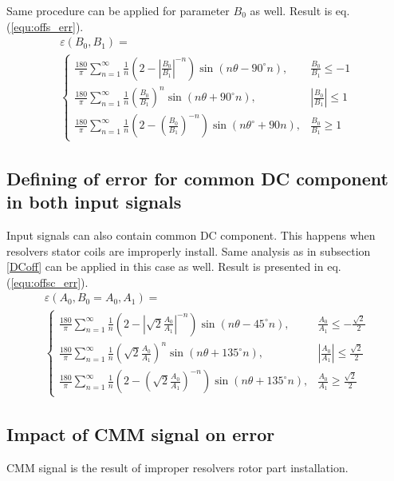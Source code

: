 \documentclass[a4paper]{article}
\begin{document}
Same procedure can be applied for parameter $B_0$ as well. Result is eq. (\ref{equ:offs_err}).
\begin{multline}
\label{equ:offs_err}
\varepsilon(B_0, B_1)=\\
\begin{cases}
\frac{180}{\pi}\sum_{n=1}^{\infty}\frac{1}{n}(2-|\frac{B_0}{B_1}|^{-n}) \sin (n \theta -  90^\circ n), & \frac{B_0}{B_1}\leq -1 \\
\frac{180}{\pi}\sum_{n=1}^{\infty}\frac{1}{n}(\frac{B_0}{B_1})^n \sin (n \theta + 90^\circ n), & |\frac{B_0}{B_1}|\leq 1 \\
\frac{180}{\pi}\sum_{n=1}^{\infty}\frac{1}{n}(2-(\frac{B_0}{B_1})^{-n}) \sin (n \theta^\circ + 90 n), & \frac{B_0}{B_1}\geq 1
\end{cases}
\end{multline}

\subsection{Defining of error for common DC component in both input signals}
Input signals can also contain common DC component. 
This happens when resolvers stator coils are improperly install. Same analysis as in subsection \ref{DCoff} can be applied in this case as well. Result is presented in eq. (\ref{equ:offsc_err}).
\begin{multline}
\label{equ:offsc_err}
\varepsilon(A_0,B_0=A_0, A_1)=\\
\begin{cases}
\frac{180}{\pi}\sum_{n=1}^{\infty}\frac{1}{n}(2-|\sqrt{2}\frac{A_0}{A_1}|^{-n}) \sin (n \theta - 45^\circ n), & \frac{A_0}{A_1}\leq -\frac{\sqrt{2}}{2} \\
\frac{180}{\pi}\sum_{n=1}^{\infty}\frac{1}{n}(\sqrt{2}\frac{A_0}{A_1})^n \sin (n \theta + 135^\circ n), & |\frac{A_0}{A_1}|\leq \frac{\sqrt{2}}{2} \\
\frac{180}{\pi}\sum_{n=1}^{\infty}\frac{1}{n}(2-(\sqrt{2}\frac{A_0}{A_1})^{-n}) \sin (n \theta +135^\circ n), & \frac{A_0}{A_1}\geq \frac{\sqrt{2}}{2}
\end{cases}
\end{multline}

\subsection{Impact of CMM signal on error}
CMM signal is the result of  improper resolvers rotor part installation.
\end{document}
